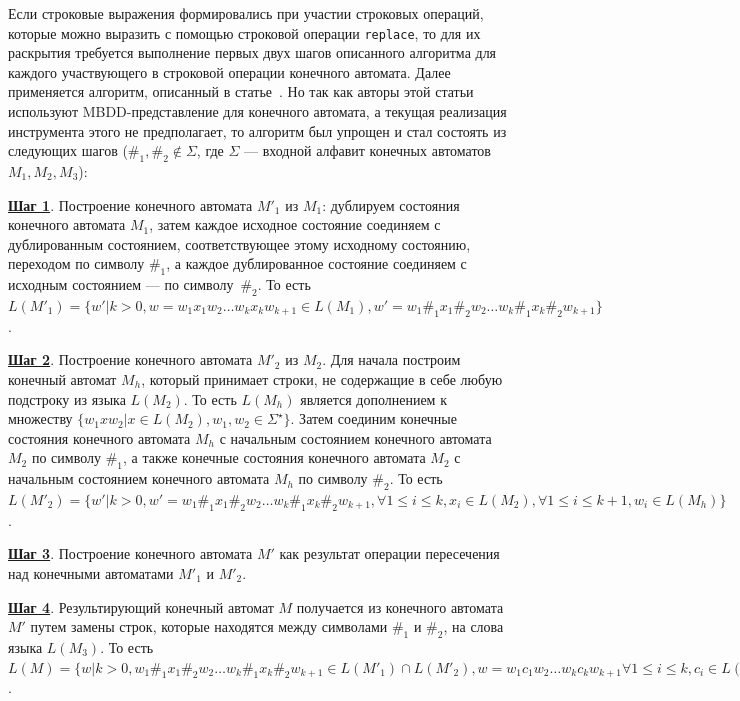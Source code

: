 Если строковые выражения формировались при участии строковых операций, которые можно выразить с помощью строковой операции \verb|replace|, то для их раскрытия требуется выполнение первых двух шагов описанного алгоритма для каждого участвующего в строковой операции конечного автомата. Далее применяется алгоритм, описанный в статье~\cite{ReplaceFangYu}. Но так как авторы этой статьи используют MBDD-представление для конечного автомата, а текущая реализация инструмента этого не предполагает, то алгоритм был упрощен и стал состоять из следующих шагов ($\#_1, \#_2 \notin \Sigma$, где $\Sigma$ --- входной алфавит конечных автоматов $M_1, M_2, M_3$): 

\textbf{\underline{Шаг 1}}. Построение конечного автомата $M'_1$ из $M_1$: дублируем состояния конечного автомата $M_1$, затем каждое исходное состояние соединяем с дублированным состоянием, соответствующее этому исходному состоянию, переходом по символу $\#_1$, а каждое дублированное состояние соединяем с исходным состоянием --- по символу~$\#_2$. То есть $L(M'_1) = \{ w' | k > 0, w =  w_{1}x_{1}w_{2}\ldots w_{k}x_{k}w_{k+1} \in L(M_1), w' = w_{1}\#_{1}x_{1}\#_{2}w_{2}\ldots w_{k}\#_{1}x_{k}\#_{2}w_{k+1}\}$.

\textbf{\underline{Шаг 2}}. Построение конечного автомата $M'_2$ из $M_2$. Для начала построим конечный автомат $M_h$, который принимает строки, не содержащие в себе любую подстроку из языка $L(M_2)$.  То есть $L(M_h)$ является дополнением к множеству $\{w_{1}xw_{2} | x \in L(M_2), w_1, w_2 \in \Sigma^{\star}\}$. Затем соединим конечные состояния конечного автомата $M_h$ с начальным состоянием конечного автомата $M_2$ по символу $\#_1$, а также конечные состояния конечного автомата $M_2$ с начальным состоянием конечного автомата $M_h$ по символу $\#_2$. То есть $L(M'_2) = \{ w' | k > 0, w' = w_{1}\#_{1}x_{1}\#_{2}w_{2} \ldots w_{k}\#_{1}x_{k}\#_{2}w_{k+1}, \forall 1 \le i \le k, x_i \in L(M_2), \forall 1 \le i \le k+1, w_i \in L(M_h)\}$.

\textbf{\underline{Шаг 3}}. Построение конечного автомата $M'$ как результат операции пересечения над конечными автоматами $M'_1$ и $M'_2$.

\textbf{\underline{Шаг 4}}. Результирующий конечный автомат $M$ получается из конечного автомата $M'$ путем замены строк, которые находятся между символами $\#_1$ и $\#_2$, на слова языка $L(M_3)$. То есть $L(M) = \{ w | k > 0, w_{1}\#_{1}x_{1}\#_{2}w_{2}\ldots w_{k}\#_{1}x_{k}\#_{2}w_{k+1} \in L(M'_1) \cap L(M'_2), w = w_{1}c_{1}w_{2}\ldots w_{k}c_{k}w_{k+1} \forall 1 \le i \le k, c_i \in L(M_3)\}$.

